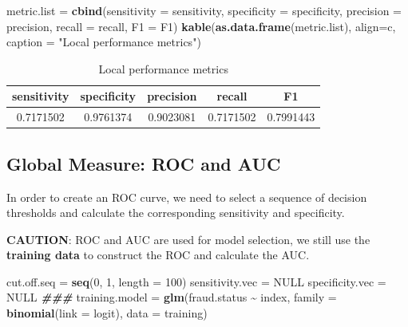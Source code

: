 \documentclass[
]{book}
\newenvironment{Shaded}{\begin{snugshade}}{\end{snugshade}}
\newcommand{\AttributeTok}[1]{\textcolor[rgb]{0.13,0.29,0.53}{#1}}
\newcommand{\ConstantTok}[1]{\textcolor[rgb]{0.56,0.35,0.01}{#1}}
\newcommand{\DecValTok}[1]{\textcolor[rgb]{0.00,0.00,0.81}{#1}}
\newcommand{\DocumentationTok}[1]{\textcolor[rgb]{0.56,0.35,0.01}{\textbf{\textit{#1}}}}
\newcommand{\FunctionTok}[1]{\textcolor[rgb]{0.13,0.29,0.53}{\textbf{#1}}}
\newcommand{\NormalTok}[1]{#1}
\newcommand{\OtherTok}[1]{\textcolor[rgb]{0.56,0.35,0.01}{#1}}
\newcommand{\SpecialCharTok}[1]{\textcolor[rgb]{0.81,0.36,0.00}{\textbf{#1}}}
\newcommand{\StringTok}[1]{\textcolor[rgb]{0.31,0.60,0.02}{#1}}
\begin{document}
\begin{Shaded}
\begin{Highlighting}[]
\NormalTok{metric.list }\OtherTok{=} \FunctionTok{cbind}\NormalTok{(}\AttributeTok{sensitivity =}\NormalTok{ sensitivity, }
                    \AttributeTok{specificity =}\NormalTok{ specificity, }
                    \AttributeTok{precision =}\NormalTok{ precision,}
                    \AttributeTok{recall =}\NormalTok{ recall,}
                    \AttributeTok{F1 =}\NormalTok{ F1)}
\FunctionTok{kable}\NormalTok{(}\FunctionTok{as.data.frame}\NormalTok{(metric.list), }\AttributeTok{align=}\StringTok{\textquotesingle{}c\textquotesingle{}}\NormalTok{, }\AttributeTok{caption =} \StringTok{"Local performance metrics"}\NormalTok{)}
\end{Highlighting}
\end{Shaded}

\begin{table}

\caption{\label{tab:unnamed-chunk-133}Local performance metrics}
\centering
\begin{tabular}[t]{c|c|c|c|c}
\hline
sensitivity & specificity & precision & recall & F1\\
\hline
0.7171502 & 0.9761374 & 0.9023081 & 0.7171502 & 0.7991443\\
\hline
\end{tabular}
\end{table}

\hypertarget{global-measure-roc-and-auc}{%
\subsection{Global Measure: ROC and AUC}\label{global-measure-roc-and-auc}}

In order to create an ROC curve, we need to select a sequence of decision thresholds and calculate the corresponding sensitivity and specificity.

\textbf{CAUTION}: ROC and AUC are used for model selection, we still use the \textbf{training data} to construct the ROC and calculate the AUC.

\begin{Shaded}
\begin{Highlighting}[]
\NormalTok{cut.off.seq }\OtherTok{=} \FunctionTok{seq}\NormalTok{(}\DecValTok{0}\NormalTok{, }\DecValTok{1}\NormalTok{, }\AttributeTok{length =} \DecValTok{100}\NormalTok{)}
\NormalTok{sensitivity.vec }\OtherTok{=} \ConstantTok{NULL}
\NormalTok{specificity.vec }\OtherTok{=} \ConstantTok{NULL}
\DocumentationTok{\#\#\# }
\NormalTok{training.model }\OtherTok{=} \FunctionTok{glm}\NormalTok{(fraud.status }\SpecialCharTok{\textasciitilde{}}\NormalTok{ index, }\AttributeTok{family =} \FunctionTok{binomial}\NormalTok{(}\AttributeTok{link =}\NormalTok{ logit), }\AttributeTok{data =}\NormalTok{ training)}
\end{Highlighting}
\end{Shaded}
\end{document}
